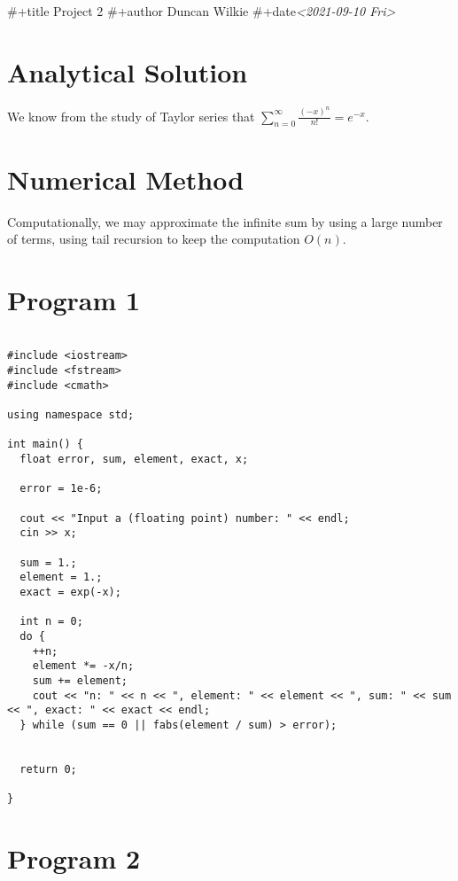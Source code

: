 \documentclass[11pt]{article}
\date{\today}
\title{}
\begin{document}
\tableofcontents

\#+title Project 2
\#+author Duncan Wilkie
\#+date\textit{<2021-09-10 Fri>}


\section{Analytical Solution}
\label{sec:orgf4520d7}

We know from the study of Taylor series that \(\sum_{n=0}^\infty\frac{(-x)^n}{n!} = e^{-x}\). 

\section{Numerical Method}
\label{sec:org8e56bb6}

Computationally, we may approximate the infinite sum by using a large number of terms, using tail recursion to keep the computation \(O(n)\).

\section{Program 1}
\label{sec:org517aaca}

\begin{verbatim}

#include <iostream>
#include <fstream>
#include <cmath>

using namespace std;

int main() {
  float error, sum, element, exact, x;

  error = 1e-6;

  cout << "Input a (floating point) number: " << endl;
  cin >> x;

  sum = 1.;
  element = 1.;
  exact = exp(-x);

  int n = 0;
  do {
    ++n;
    element *= -x/n;
    sum += element;
    cout << "n: " << n << ", element: " << element << ", sum: " << sum << ", exact: " << exact << endl;
  } while (sum == 0 || fabs(element / sum) > error);


  return 0;

}

\end{verbatim}

\section{Program 2}
\label{sec:org2b59d8a}
\end{document}
